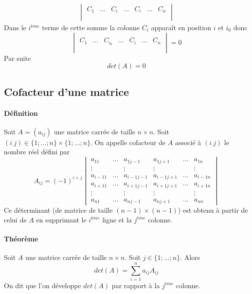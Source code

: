 \begin{itemize}
\begin{eqnarray*}
\begin{vmatrix}
          C_1 & \ldots & C_{i} & \ldots & C_i & \ldots & C_n 
        \\ \\ \end{vmatrix}
    \end{eqnarray*}
    Dans le $i^{ème}$ terme de cette somme la colonne $C_i$ apparaît en position $i$ et $i_0$ donc
    $$\begin{vmatrix} \\ C_1 & \ldots & C_{i_0} & \ldots & C_i & \ldots & C_n \\ \\ \end{vmatrix} = 0$$
    Par suite
    $$det(A) = 0$$
\end{itemize}

%
\subsection{Cofacteur d'une matrice}
%
\paragraph{Définition} Soit $A = (a_{ij})$ une matrice carrée de taille $n\times n$. Soit $(i ~ j) \in \{1; \ldots; n\} \times \{1; \ldots; n \}$. On appelle cofacteur de $A$ associé à $(i ~ j)$ le nombre réel défini par
$$A_{ij} = (-1)^{i+j} \begin{vmatrix}
  a_{11} & \ldots & a_{1 j-1} & a_{1 j+1} & \ldots & a_{1n} \\
  \vdots &  & \vdots & \vdots &  & \vdots \\
  a_{i-1 1} & \ldots & a_{i-1 j-1} & a_{i-1 j+1} & \ldots & a_{i-1 n} \\
  a_{i+1 1} & \ldots & a_{i+1 j-1} & a_{i+1 j+1} & \ldots & a_{i+1 n} \\
  \vdots &  & \vdots & \vdots &  & \vdots \\
  a_{n 1} & \ldots & a_{n j-1} & a_{n j+1} & \ldots & a_{nn}
\end{vmatrix}$$
Ce déterminant (de matrice de taille $(n-1) \times (n-1)$) est obtenu à partir de celui de $A$ en supprimant le $i^{ème}$ ligne et la $j^{ème}$ colonne.

\paragraph{Théorème} Soit $A$ une matrice carrée de taille $n\times n$. Soit $j \in \{1; \ldots; n\}$. Alors
$$det(A) = \sum_{i=1}^{n} a_{ij} A_{ij}$$
On dit que l'on développe $det(A)$ par rapport à la $j^{ème}$ colonne.
  
